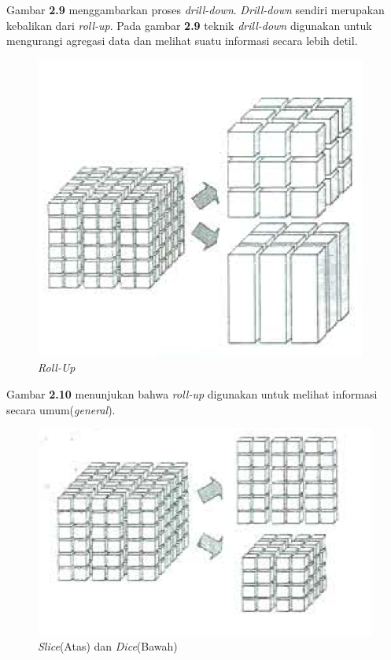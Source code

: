 Gambar \textbf{2.9} menggambarkan proses \textit{drill-down}. \textit{Drill-down} sendiri merupakan kebalikan dari \textit{roll-up}. Pada gambar \textbf{2.9} teknik \textit{drill-down} digunakan untuk mengurangi agregasi data dan melihat suatu informasi secara lebih detil.

\begin{figure}[h]
	\centering
	\includegraphics[scale=0.85]{Gambar/roll-up}
	\caption{\textit{Roll-Up}\cite{Matteo:2009}}
	\end{figure} 
	
Gambar \textbf{2.10} menunjukan bahwa \textit{roll-up} digunakan untuk melihat informasi secara umum(\textit{general}).

\begin{figure}[h]
	\centering
	\includegraphics[scale=0.85]{Gambar/slice-dice}
	\caption{\textit{Slice}(Atas) dan \textit{Dice}(Bawah)\cite{Matteo:2009}}
	\end{figure} 

